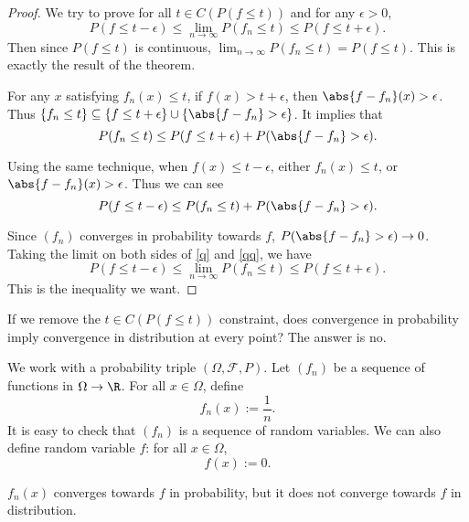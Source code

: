     \begin{proof}
        We try to prove for all $t \in C(P(f \leq t))$ and for any $\epsilon > 0$, 
        \begin{equation*}
            P(f \leq t - \epsilon) \leq \lim_{n \to \infty} P(f_n \leq t) \leq P(f \leq t + \epsilon).
        \end{equation*}
        Then since $P(f \leq t)$ is continuous, $\lim_{n \to \infty} P(f_n \leq t) = P(f \leq t)$. This is exactly the result of the theorem.

        For any $x$ satisfying $f_n(x) \leq t$, if $f(x) > t + \epsilon$, then $\abs{f - f_n}(x) > \epsilon$. Thus $\{f_n \leq t\} \subseteq \{f \leq t + \epsilon\} \cup \{\abs{f - f_n} > \epsilon\}$. It implies that 
        \begin{equation}
            \label{q}
            P(f_n \leq t) \leq P(f \leq t + \epsilon) + P(\abs{f - f_n} > \epsilon).
        \end{equation}

        Using the same technique, when $f(x) \leq t - \epsilon$, either $f_n(x) \leq t$, or $\abs{f - f_n}(x) > \epsilon$. Thus we can see
        \begin{equation}
            \label{qq}
            P(f \leq t - \epsilon) \leq P(f_n \leq t) + P(\abs{f - f_n} > \epsilon).
        \end{equation}

        Since $(f_n)$ converges in probability towards $f$, $P(\abs{f - f_n} > \epsilon) \to 0$. Taking the limit on both sides of \cref{q} and \cref{qq}, we have 
        \begin{equation*}
            P(f \leq t - \epsilon) \leq \lim_{n \to \infty} P(f_n \leq t) \leq P(f \leq t + \epsilon).
        \end{equation*}
        This is the inequality we want.
    \end{proof}

    If we remove the $t \in C(P(f \leq t))$ constraint, does convergence in probability imply convergence in distribution at every point? The answer is no.

    \begin{example}
        \label{4}
        We work with a probability triple $(\Omega, \mathcal{F}, P)$. Let $(f_n)$ be a sequence of functions in $\Omega \to \R$. For all $x \in \Omega$, define \[
            f_n(x) := \frac{1}{n}.
        \]
        It is easy to check that $(f_n)$ is a sequence of random variables. We can also define random variable $f$: for all $x \in \Omega$, \[
            f(x) := 0.    
        \]

        $f_n(x)$ converges towards $f$ in probability, but it does not converge towards $f$ in distribution.
    \end{example}

